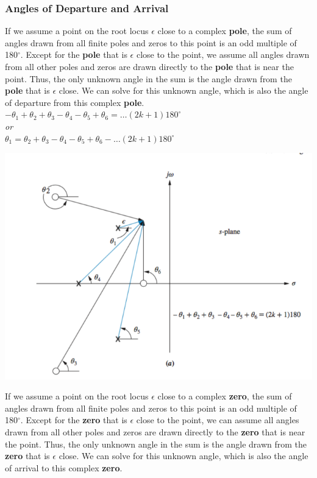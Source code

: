 \documentclass[11pt]{article}
\begin{document}
    \subsubsection{Angles of Departure and Arrival}

    If we assume a point on the root locus $\epsilon$ close to a complex \textbf{pole}, the sum of angles drawn from all finite poles and zeros to this point is an odd multiple of 180$^\circ$. Except for the \textbf{pole} that is $\epsilon$ close to the point, we assume all angles drawn from all other poles and zeros are drawn directly to the \textbf{pole} that is near the point. Thus, the only unknown angle in the sum is the angle drawn from the \textbf{pole} that is $\epsilon$ close. We can solve for this unknown angle, which is also the angle of departure from this complex \textbf{pole}. \\

    $-\theta_1 + \theta_2 + \theta_3 - \theta_4 - \theta_5 + \theta_6 =(2k+1)180^\circ$ \\ 
    
    \textit{or} \\ 

    $\theta_1 = \theta_2 + \theta_3 - \theta_4 - \theta_5 + \theta_6 -(2k+1)180^\circ$ \\

    \begin{center}
        \includegraphics[width=300 px]{img/angles-pole} \\
    \end{center}    
    
    If we assume a point on the root locus $\epsilon$ close to a complex \textbf{zero}, the sum of angles drawn from all finite poles and zeros to this point is an odd multiple of 180$^\circ$. Except for the \textbf{zero} that is $\epsilon$ close to the point, we can assume all angles drawn from all other poles and zeros are drawn directly to the \textbf{zero} that is near the point. Thus, the only unknown angle in the sum is the angle drawn from the \textbf{zero} that is $\epsilon$ close. We can solve for this unknown angle, which is also the angle of arrival to this complex \textbf{zero}. \\ 
\end{document}
